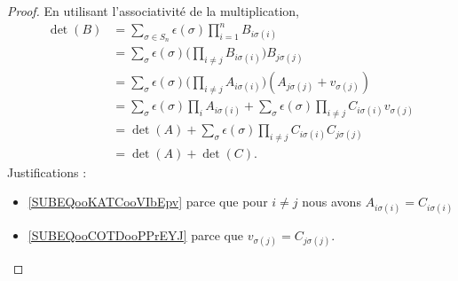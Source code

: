\begin{proof}
	En utilisant l'associativité de la multiplication,
	\begin{subequations}
		\begin{align}
			\det(B) & =\sum_{\sigma\in S_n}\epsilon(\sigma)\prod_{i=1}^nB_{i\sigma(i)}                                                                                                \\
			        & =\sum_{\sigma}\epsilon(\sigma)\big( \prod_{i\neq j}B_{i\sigma(i)} \big)B_{j\sigma(j)}                                                                           \\
			        & =\sum_{\sigma}\epsilon(\sigma)\big( \prod_{i\neq j}A_{i\sigma(i)} \big)(A_{j\sigma(j)}+v_{\sigma(j)})                                                           \\
			        & =\sum_{\sigma}\epsilon(\sigma)\prod_iA_{i\sigma(i)}+\sum_{\sigma}\epsilon(\sigma)\prod_{i\neq j}C_{i\sigma(i)}v_{\sigma(j)}         \label{SUBEQooKATCooVIbEpv} \\
			        & =\det(A)+\sum_{\sigma}\epsilon(\sigma)\prod_{i\neq j}C_{i\sigma(i)}C_{j\sigma(j)}  \label{SUBEQooCOTDooPPrEYJ}                                                  \\
			        & =\det(A)+\det(C).
		\end{align}
	\end{subequations}
	Justifications :
	\begin{itemize}
		\item \ref{SUBEQooKATCooVIbEpv} parce que pour \( i\neq j\) nous avons \( A_{i\sigma(i)}=C_{i\sigma(i)}\)
		\item \ref{SUBEQooCOTDooPPrEYJ} parce que \( v_{\sigma(j)}=C_{j\sigma(j)}\).
	\end{itemize}
\end{proof}

